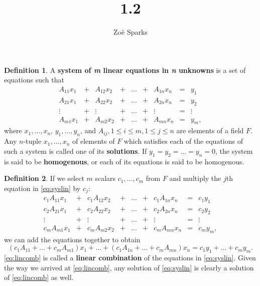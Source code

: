 \documentclass[12pt]{article}
\title{1.2}
\author{Zoë Sparks}
\begin{document}
\theoremstyle{definition}

\newtheorem{thm}{Theorem}
\newtheorem*{nthm}{Theorem}
\newtheorem{sthm}{}[thm]
\newtheorem{lemma}{Lemma}[thm]
\newtheorem*{cor}{Corollary}
\newtheorem*{prop}{Property}
\newtheorem*{defn}{Definition}
\newtheorem*{comm}{Comment}
\newtheorem*{exm}{Example}

\maketitle

\begin{defn}
  A \textbf{system of \textit{m} linear equations in \textit{n}
  unknowns} is a set of equations such that
  \begin{equation} \label{eq:syslin}
  \begin{array}{ccccccccc}
    A_{11}x_1 & + & A_{12}x_2 & + & \ldots & + & A_{1n}x_n & = & y_1\\
    A_{21}x_1 & + & A_{22}x_2 & + & \ldots & + & A_{2n}x_n & = & y_2\\
    \vdots    & + & \vdots    & + & \ldots & + & \vdots    & = & \vdots\\
    A_{m1}x_1 & + & A_{m2}x_2 & + & \ldots & + & A_{mn}x_n & = & y_m,
  \end{array}
  \end{equation}
  where $x_1,\ldots,x_n$, $y_1,\ldots,y_n$, and $A_{ij}, 1 \leq i
  \leq m, 1 \leq j \leq n$ are elements of a field $F$. Any
  $n$-tuple $x_1,\ldots,x_n$ of elements of $F$ which satisfies
  each of the equations of such a system is called one of its
  \textbf{solutions}. If $y_1 = y_2 = \ldots = y_n = 0$, the
  system is said to be \textbf{homogenous}, or each of its
  equations is said to be homogenous.
\end{defn}

\begin{defn}
  If we select $m$ scalars $c_1,\ldots,c_m$ from $F$ and multiply
  the $j$th equation in \eqref{eq:syslin} by $c_j$:
  \[
  \begin{array}{ccccccccc}
    c_{1}A_{11}x_1 & + & c_{1}A_{12}x_2 & + & \ldots & + & c_{1}A_{1n}x_n & = & c_{1}y_1\\
    c_{2}A_{21}x_1 & + & c_{2}A_{22}x_2 & + & \ldots & + & c_{2}A_{2n}x_n & = & c_{2}y_2\\
    \vdots    & + & \vdots    & + & \ldots & + & \vdots    & = & \vdots\\
    c_{m}A_{m1}x_1 & + & c_{m}A_{m2}x_2 & + & \ldots & + & c_{m}A_{mn}x_n & = & c_{m}y_m,
  \end{array}
  \]
  we can add the equations together to obtain
  \begin{equation} \label{eq:lincomb}
    (c_{1}A_{11} + \ldots + c_{m}A_{m1})x_1 + \ldots +
    (c_{1}A_{1n} + \ldots + c_{m}A_{mn})x_n = c_{1}y_1 + \ldots +
    c_{m}y_m.
  \end{equation}
  \eqref{eq:lincomb} is called a \textbf{linear combination} of
  the equations in \eqref{eq:syslin}. Given the way we arrived at
  \eqref{eq:lincomb}, any solution of \eqref{eq:syslin} is
  clearly a solution of \eqref{eq:lincomb} as well.
\end{defn}
\end{document}
